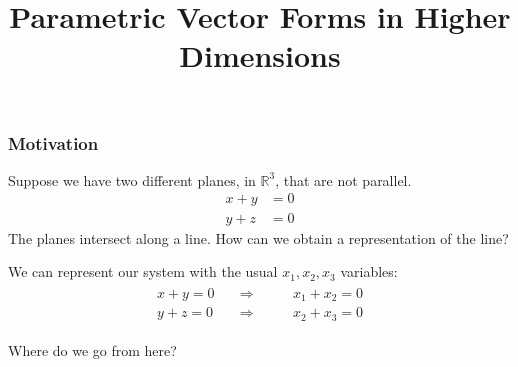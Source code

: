 \title{Parametric Vector Forms in Higher Dimensions} 
\subtitle{\SubTitleName}
\institute[]{\Course}
\author{\Instructor}
\maketitle   

\begin{frame}
\frametitle{Motivation}



Suppose we have two different planes, \pause in $\mathbb R^3$, \pause that are not parallel. 
\pause
\begin{align*}
    x+y &= 0\\
    y+z &=0 
\end{align*}
\pause 
The planes intersect along a line. How can we obtain a representation of the line? 

\vspace{12pt}

\pause 
We can represent our system with the usual $x_1, x_2, x_3$ variables: 
\begin{align*}
\begin{array}{ccc}
    x + y = 0  & \quad \Rightarrow \quad \quad  & x_1 + x_2 = 0\\
    y + z = 0 & \quad \Rightarrow \quad \quad & x_2 + x_3 = 0
\end{array}
\end{align*}

Where do we go from here? 

\end{frame}

